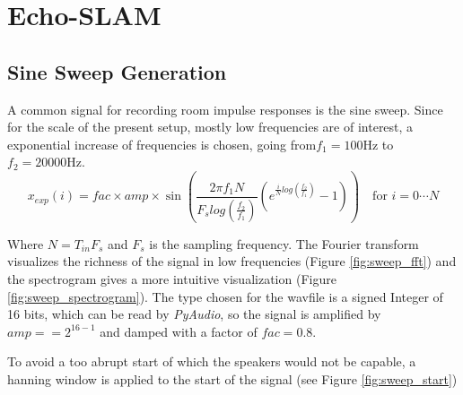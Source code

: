 \newpage
\section{Echo-SLAM}

\subsection{Sine Sweep Generation}

A common signal for recording room impulse responses is the sine sweep. 
Since for the scale of the present setup, mostly low frequencies are of interest, a exponential increase of frequencies is chosen, going from$f_1=100 \text{Hz}$ to $f_2=20000 \text{Hz}$. 
\begin{equation}
    x_{exp}(i) = fac \times amp \times \sin(\frac{2 \pi f_1 N}{F_s log(\frac{f_2}{f_1})}  (e^{\frac{i}{N}log(\frac{f_2}{f_1})} - 1)) \quad \text{for $i = 0 \cdots N$}
    \label{}
\end{equation}

Where $N=T_{in}F_s$ and $F_s$ is the sampling frequency. The Fourier transform visualizes the richness of the signal in low frequencies (Figure \ref{fig:sweep_fft}) and the spectrogram gives a more intuitive visualization (Figure \ref{fig:sweep_spectrogram}).
The type chosen for the wavfile is a signed Integer of 16 bits, which can be read by \textit{PyAudio}, so the signal is amplified by $amp==2^{16-1}$ and damped with a factor of $fac=0.8$. 

To avoid a too abrupt start of which the speakers would not be capable, a hanning window is applied to the start of the signal (see Figure \ref{fig:sweep_start})

